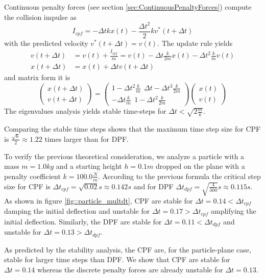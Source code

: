 Continuous penalty forces (see section \ref{sec:ContinuousPenaltyForces}) compute the collision impulse as
\begin{equation}
I_{cpf}=-\Delta t kx(t)-\frac{\Delta t^2}{2} kv^*(t+\Delta t)
\end{equation}
with the predicted velocity $v^*(t+\Delta t)=v(t)$. The update rule yields
\begin{align}
	v(t+\Delta t)&=v(t)+\frac{I_{cpf}}{m}=v(t)-\Delta t \frac{k}{2m} x(t)-\Delta t^2 \frac{k}{m} v(t) \\
	x(t+\Delta t)&=x(t)+\Delta t v(t+\Delta t)	
\end{align}
and matrix form it is
\begin{equation}
	\begin{pmatrix}
		x(t+\Delta t) \\
		v(t+\Delta t) 
	\end{pmatrix}=	
		\begin{pmatrix}
			1-\Delta t^2\frac{k}{m} \ \ \Delta t - \Delta t^3\frac{k}{2m}  \\
		-\Delta t\frac{k}{m} \ \ 1- \Delta t^2 \frac{k}{2m}
		\end{pmatrix}
		\begin{pmatrix}
			x(t) \\
			v(t) 
		\end{pmatrix}
\end{equation}
The eigenvalues analysis yields stable time-steps for $\Delta t< \sqrt{2 \frac{m}{k}}$.

Comparing the stable time steps shows that the maximum time step size for CPF is $\frac{\sqrt{6}}{2}\approx1.22$ times larger than for DPF.

To verify the previous theoretical consideration, we analyze a particle with a mass $m=1.0kg$ and a starting height $h=0.1m$ dropped on the plane  with a penalty coefficient $k=100.0\frac{N}{m}$.
According to the previous formula the critical step size for CPF is $\Delta t_{cpf}=\sqrt{0.02}s\approx0.142s$ and for DPF $\Delta t_{dpf}=\sqrt{\frac{4}{300}}s\approx0.115s$.
As shown in figure \ref{fig::particle_multdt}, CPF are stable for $\Delta t=0.14<\Delta t_{cpf}$ damping the initial deflection and unstable for $\Delta t=0.17>\Delta t_{cpf}$ amplifying the initial deflection.
Similarly, the DPF are stable for $\Delta t=0.11<\Delta t_{dpf}$  and unstable for $\Delta t=0.13>\Delta t_{dpf}$.

As predicted by the stability analysis, the CPF are, for the particle-plane case, stable for larger time steps than DPF. We show that CPF are stable for $\Delta t=0.14$ whereas the discrete penalty forces are already unstable for $\Delta t=0.13$.

